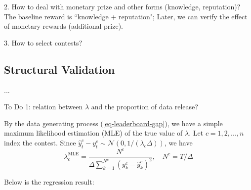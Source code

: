 \documentclass[mnsc]{informs3}
\begin{document}
2. How to deal with monetary prize and other forms (knowledge, reputation)? The baseline reward is ``knowledge + reputation"; Later, we can verify the effect of monetary rewards (additional prize). 

3. How to select contests?



\subsection{Structural Validation}

...

To Do 1: relation between $\lambda$ and the proportion of data release?

By the data generating process (\ref{eq-leaderboard-gap}), we have a simple maximum likelihood estimation (MLE) of the true value of $\lambda$. 
Let $c = {1, 2, ..., n}$ index the contest.
Since $\hat{y}_t^c - y_t^c \sim \mathcal{N}(0, 1/(\lambda_c\Delta))$, we have 
\begin{equation*}
\lambda^{\text{MLE}}_c = \frac{N^c}{\Delta\sum^{N^c}_{k=1}(y_k^c - \hat{y}_k^c)^2}, \quad N^c = T/\Delta
\end{equation*}

Below is the regression result:
\end{document}
